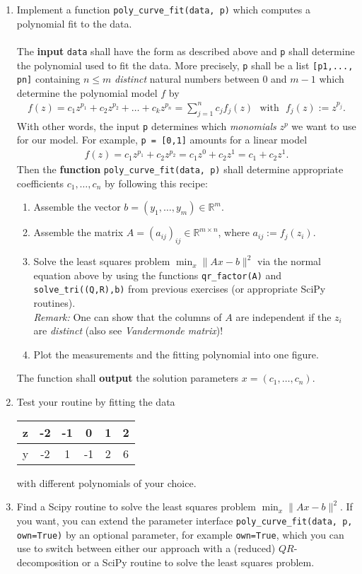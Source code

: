 \begin{enumerate}
	\item Implement a function \verb|poly_curve_fit(data, p)| which computes a polynomial fit to the data.\\ ~\\
	The \textbf{input} \verb|data| shall have the form as described above and \verb|p| shall determine the polynomial used to fit the data. More precisely, \verb|p| shall be a list \verb|[p1,..., pn]| containing $n \leq m$ \textit{distinct} natural numbers between $0$ and $m-1$ which determine the polynomial model $f$ by
	\begin{align*}
	  f(z) = c_1 z^{p_1} + c_2 z^{p_2} + \ldots +  c_k z^{p_n} = \sum_{j=1}^n c_j f_j(z) ~~~\text{with}~~~f_j(z) := z^{p_j}.
	\end{align*}
	With other words, the input \verb|p| determines which \textit{monomials} $z^{p}$ we want to use for our model. For example, \verb|p = [0,1]| amounts for a linear model
	\begin{align*}
		f(z) = c_1 z^{p_1} + c_2 z^{p_2}  = c_1 z^0 + c_2 z^1 = c_1 + c_2 z^1.
	\end{align*}
	Then the \textbf{function} \verb|poly_curve_fit(data, p)| shall determine appropriate coefficients $c_1,\ldots,c_n$ by following this recipe:
	\begin{enumerate}
		\item Assemble the vector $b = (y_1,\ldots,y_m)\in \mathbb{R}^m$.
		\item Assemble the matrix $A = (a_{ij})_{ij} \in \mathbb{R}^{m \times n}$, where $a_{ij} := f_j(z_i)$.
		\item Solve the least squares problem $\min_x \|Ax-b\|^2$ via the normal equation above by using the functions \texttt{qr\_factor(A)} and \texttt{solve\_tri((Q,R),b)} from previous exercises (or appropriate SciPy routines).\\ 
		{\small \textit{Remark:} One can show that the columns of $A$ are independent if the $z_i$ are \textit{distinct} (also see \textit{Vandermonde matrix})!}
		\item Plot the measurements and the fitting polynomial into one figure.
	\end{enumerate}
	The function shall \textbf{output} the solution parameters $x = (c_1,\ldots, c_n)$.
	\item Test your routine by fitting the data 
	\begin{center}
		\begin{tabular}{l|c c c c c}
			z&-2&-1&0&1&2\\
			\hline
			y&-2&1&-1&2&6
		\end{tabular}
	\end{center}
with different polynomials of your choice.
	\item Find a Scipy routine to solve the least squares problem $\min_x \|Ax-b\|^2$. If you want, you can extend the parameter interface \verb|poly_curve_fit(data, p, own=True)| by an optional parameter, for example \texttt{own=True}, which you can use to switch between either our approach with a (reduced) $QR$-decomposition 
	or a SciPy routine to solve the least squares problem.
\end{enumerate}
